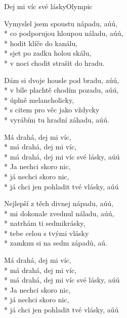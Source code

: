 \documentclass[10.5pt]{book}
\begin{document}
\fi
\begin{poem}{Dej mi víc své lásky}{Olympic}

\settowidth{\versewidth}{Vymyslel jsem spoustu nápadu, aúú,}

Vymyslel jsem spoustu nápadu, aúú,\\*
co podporujou hloupou náladu, aúú,\\*
hodit klíče do kanálu,\\*
sjet po zadku holou skálu,\\*
v noci chodit strašit do hradu.

Dám si dvoje housle pod bradu, aúú,\\*
v bíle plachtě chodím pozadu, aúú,\\*
úplně melancholicky,\\*
s citem pro věc jako vždycky\\*
vyrábím tu hradní záhadu, aúú.

Má drahá, dej mi víc,\\*
má drahá, dej mi víc,\\*
má drahá, dej mi víc své lásky, aúú\\*
Ja nechci skoro nic,\\*
já nechci skoro nic,\\*
já chci jen pohladit tvé vlásky, aúú

Nejlepší z těch divnej nápadu, aúú,\\*
mi dokonale zvednul náladu, aúú,\\*
natrhám ti sedmikrásky,\\*
tebe celou s tvými vlásky\\*
zamknu si na sedm západů, aú.

Má drahá, dej mi víc,\\*
má drahá, dej mi víc,\\*
má drahá, dej mi víc své lásky, aúú\\*
Ja nechci skoro nic,\\*
já nechci skoro nic,\\*
já chci jen pohladit tvé vlásky, aúú

\end{poem}
\end{document}
